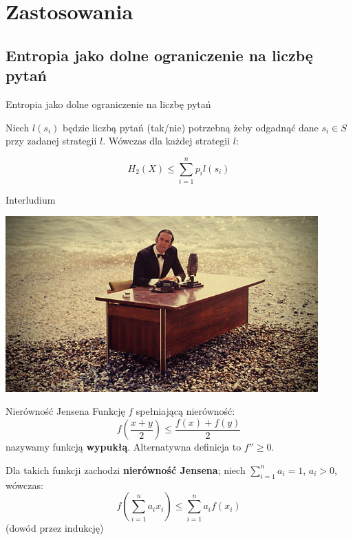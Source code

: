 \documentclass{beamer}
\begin{document}
\section{Zastosowania}

\subsection{Entropia jako dolne ograniczenie na liczbę pytań}


\begin{frame}{Entropia jako dolne ograniczenie na liczbę pytań}

Niech $l(s_i)$ będzie liczbą pytań (tak/nie) potrzebną żeby odgadnąć
dane $s_i \in S$ przy zadanej strategii $l$. Wówczas dla każdej
strategii $l$:

$$
H_2(X) \leq \sum_{i=1}^{n} p_i l(s_i)
$$

\end{frame}


\begin{frame}{Interludium}
\begin{center}
\includegraphics[width=0.9\textwidth]{img/cleese-at-ocean-desk.jpg}
\end{center}
\end{frame}

\begin{frame}{Nierówność Jensena}
Funkcję $f$ spełniającą nierówność:
$$
f\left(\frac{x + y}{2}\right) \leq \frac{f(x) + f(y)}{2}
$$
nazywamy funkcją \textbf{wypukłą}. Alternatywna definicja to $f'' \geq 0$.
\newline

Dla takich funkcji zachodzi \textbf{nierówność Jensena};
niech $\sum_{i=1}^{n} a_i = 1$, $a_i > 0$, wówczas:
$$
f\left(\sum_{i=1}^{n} a_i x_i\right) \leq \sum_{i=1}^{n} a_i f(x_i)
$$
(dowód przez indukcję)
\end{frame}
\end{document}
